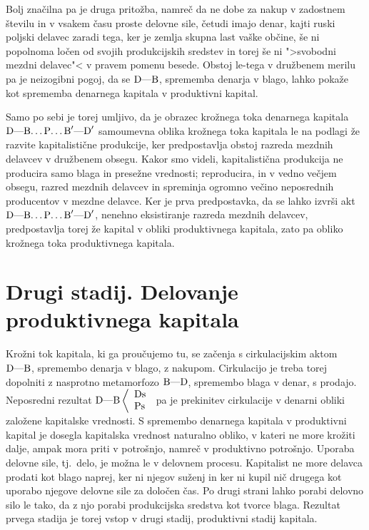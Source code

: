 \documentclass[kapital_02.tex]{subfiles}
\begin{document}
Bolj značilna pa je druga pritožba, namreč da ne dobe za nakup v zadostnem številu in v vsakem času proste delovne sile, četudi imajo denar, kajti ruski poljski delavec zaradi tega, ker je zemlja skupna last vaške občine, še ni popolnoma ločen od svojih produkcijskih sredstev in torej še ni ">svobodni mezdni delavec"< v pravem pomenu besede. Obstoj le-tega v družbenem merilu pa je neizogibni pogoj, da se \( \textrm{D}\textrm{---}\textrm{B} \), sprememba denarja v blago, lahko pokaže kot sprememba denarnega kapitala v produktivni kapital.

Samo po sebi je torej umljivo, da je obrazec krožnega toka denarnega kapitala \( \textrm{D}\textrm{---}\textrm{B}\textrm{\dots}\textrm{P}\textrm{\dots}\textrm{B}'\textrm{---}\textrm{D}' \) samoumevna oblika krožnega toka kapitala le na podlagi že razvite kapitalistične produkcije, ker predpostavlja obstoj razreda mezdnih delavcev v družbenem obsegu. Kakor smo videli, kapitalistična produkcija ne producira samo blaga in presežne vrednosti; reproducira, in v vedno večjem obsegu, razred mezdnih delavcev in spreminja ogromno večino neposrednih producentov v mezdne delavce. Ker je prva predpostavka, da se lahko izvrši akt \( \textrm{D}\textrm{---}\textrm{B}\textrm{\dots}\textrm{P}\textrm{\dots}\textrm{B}'\textrm{---}\textrm{D}' \), nenehno eksistiranje razreda mezdnih delavcev, predpostavlja torej že kapital v obliki produktivnega kapitala, zato pa obliko krožnega toka produktivnega kapitala.

\section{Drugi stadij. Delovanje produktivnega kapitala}

Krožni tok kapitala, ki ga proučujemo tu, se začenja s cirkulacijskim aktom \( \textrm{D}\textrm{---}\textrm{B} \), spremembo denarja v blago, z nakupom. Cirkulacijo je treba torej dopolniti z nasprotno metamorfozo \( \textrm{B}\textrm{---}\textrm{D} \), spremembo blaga v denar, s prodajo. Neposredni rezultat \( 
    \textrm{D}\textrm{---}\textrm{B}\left< 
    \begin{array}{l}
        \textrm{Ds}\\
        \textrm{Ps}\\
    \end{array}
    \right. 
\) pa je prekinitev cirkulacije v denarni obliki založene kapitalske vrednosti. S spremembo denarnega kapitala v produktivni kapital je dosegla kapitalska vrednost naturalno obliko, v kateri ne more krožiti dalje, ampak mora priti v potrošnjo, namreč v produktivno potrošnjo. Uporaba delovne sile, tj.\ delo, je možna le v delovnem procesu. Kapitalist ne more delavca prodati kot blago naprej, ker ni njegov suženj in ker ni kupil nič drugega kot uporabo njegove delovne sile za določen čas. Po drugi strani lahko porabi delovno silo le tako, da z njo porabi produkcijska sredstva kot tvorce blaga. Rezultat prvega stadija je torej vstop v drugi stadij, produktivni stadij kapitala.
\end{document}
